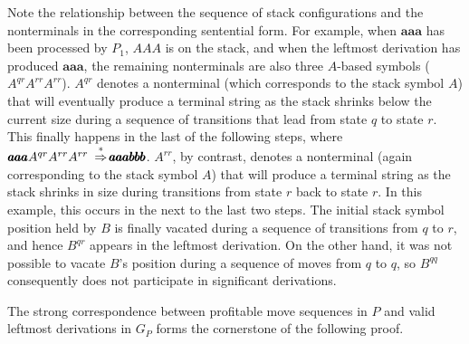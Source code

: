 Note the relationship between the sequence of stack configurations and the
nonterminals in the corresponding sentential form. For example, when $\pmb{aaa}$
has been processed by $P_1$, $AAA$ is on the stack, and when the leftmost
derivation has produced $\pmb{aaa}$, the remaining nonterminals are also three
$A$-based symbols ($A^{qr}  A^{rr}  A^{rr}$). $A^{qr}$ denotes a nonterminal (which
corresponds to the stack symbol $A$) that will eventually produce a terminal
string as the stack shrinks below the current size during a sequence of
transitions that lead from state $q$ to state $r$. This finally happens in the
last of the following steps, where $\pmb{aaa}A^{qr}  A^{rr}  A^{rr}\ \operatorname{\overset{*}{\Rightarrow}}
\pmb{aaabbb}$. $A^{rr}$, by contrast, denotes a nonterminal (again corresponding
to the stack symbol $A$) that will produce a terminal string as the stack
shrinks in size during transitions from state $r$ back to state $r$. In this
example, this occurs in the next to the last two steps. The initial stack symbol
position held by $B$ is finally vacated during a sequence of transitions from
$q$ to $r$, and hence $B^{qr}$ appears in the leftmost derivation. On the other
hand, it was not possible to vacate $B$'s position during a sequence of moves
from $q$ to $q$, so $B^{qq}$ consequently does not participate in significant
derivations.

The strong correspondence between profitable move sequences in $P$ and valid
leftmost derivations in $G_P$ forms the cornerstone of the following proof.

